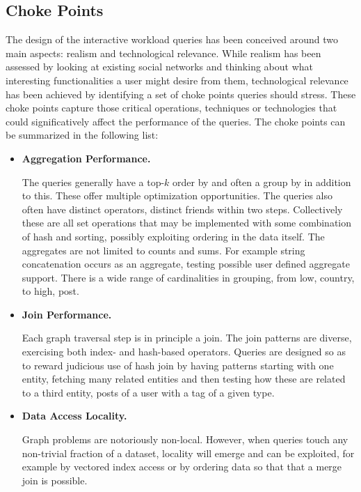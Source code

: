 \subsection{Choke Points}

The design of the interactive workload queries has been conceived around two
main aspects: realism and technological relevance.  While realism has been
assessed by looking at existing social networks and thinking about what
interesting functionalities a user might desire from them, technological
relevance has been achieved by identifying a set of choke points queries should
stress.  These choke points capture those critical operations, techniques or
technologies that  could significatively affect the performance of the queries.
The choke points can be summarized in the following list:

\begin{itemize}
    \item \textbf{Aggregation Performance.}

        The queries generally have a top-$k$ order by and often a group by in
        addition to this.  These offer multiple optimization opportunities.
        The queries also often have distinct operators, \ie distinct friends
        within two steps.  Collectively these are all set operations that may
        be implemented with some combination of hash and sorting, possibly
        exploiting ordering in the data itself.  The aggregates are not
        limited to counts and sums.  For example string concatenation occurs
        as an aggregate, testing possible user defined aggregate support.
        There is a wide range of cardinalities in grouping, from low, \eg country, to high, \eg post.

    \item \textbf{Join Performance.}

        Each graph traversal step is in principle a join.  The join patterns are
        diverse, exercising both index- and hash-based operators.   Queries are designed
        so as to reward judicious use of hash join by having patterns starting with one
        entity, fetching many related entities and then testing how these are related
        to a third entity, \eg posts of a user with a tag of a given type.

    \item \textbf{Data Access Locality.}

        Graph problems are notoriously non-local.  However, when queries touch
        any non-trivial fraction of a dataset, locality will emerge and can be
        exploited, for example by vectored index access or by ordering data so
        that that a merge join is possible.


\end{itemize}
